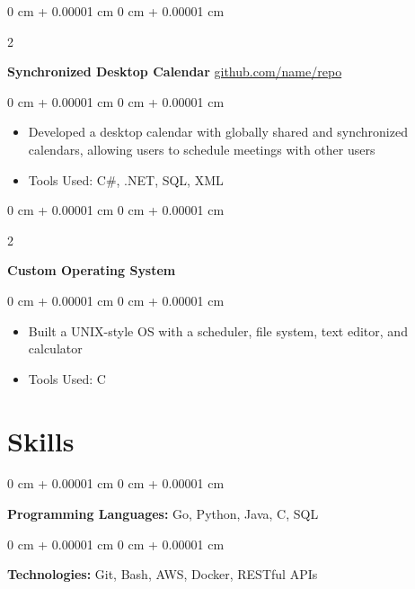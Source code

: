 \documentclass[10pt, letterpaper]{article}
\newenvironment{highlights}{
    \begin{itemize}[
        topsep=0.10 cm,
        parsep=0.10 cm,
        partopsep=0pt,
        itemsep=0pt,
        leftmargin=0 cm + 10pt
    ]
}{
    \end{itemize}
} %
\newenvironment{onecolentry}{
    \begin{adjustwidth}{
        0 cm + 0.00001 cm
    }{
        0 cm + 0.00001 cm
    }
}{
    \end{adjustwidth}
} %
\newenvironment{twocolentry}[2][]{
    \onecolentry
    \def\secondColumn{#2}
    \setcolumnwidth{\fill, 4.5 cm}
    \begin{paracol}{2}
}{
    \switchcolumn \raggedleft \secondColumn
    \end{paracol}
    \endonecolentry
} %
\begin{document}
        \vspace{0.2 cm}

        \begin{twocolentry}{
            \href{https://github.com/sinaatalay/rendercv}{github.com/name/repo}
        }
            \textbf{Synchronized Desktop Calendar}\end{twocolentry}

        \vspace{0.10 cm}
        \begin{onecolentry}
            \begin{highlights}
                \item Developed a desktop calendar with globally shared and synchronized calendars, allowing users to schedule meetings with other users
                \item Tools Used: C\#, .NET, SQL, XML
            \end{highlights}
        \end{onecolentry}


        \vspace{0.2 cm}

        \begin{twocolentry}{
            2002
        }
            \textbf{Custom Operating System}\end{twocolentry}

        \vspace{0.10 cm}
        \begin{onecolentry}
            \begin{highlights}
                \item Built a UNIX-style OS with a scheduler, file system, text editor, and calculator
                \item Tools Used: C
            \end{highlights}
        \end{onecolentry}



    
    \section{Skills}



        
        \begin{onecolentry}
            \textbf{Programming Languages:} Go, Python, Java, C, SQL
        \end{onecolentry}

        \vspace{0.2 cm}

        \begin{onecolentry}
            \textbf{Technologies:} Git, Bash, AWS, Docker, RESTful APIs
        \end{onecolentry}


    
\end{document}
